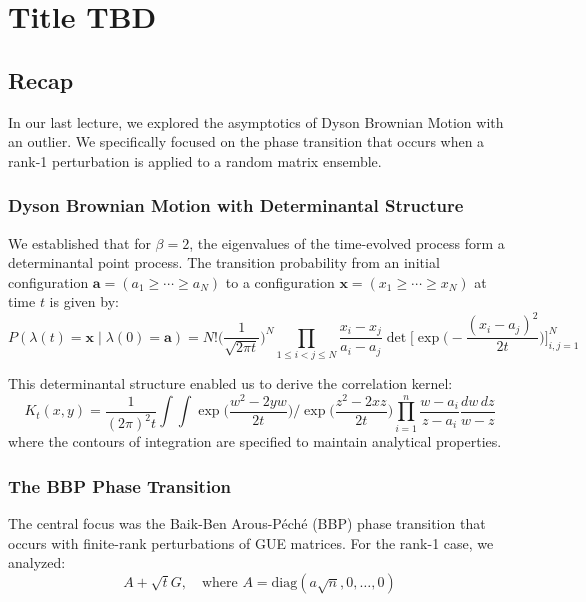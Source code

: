 \documentclass[letterpaper,11pt,oneside,reqno]{book}
\numberwithin{equation}{chapter}  %
\theoremstyle{definition}
\begin{document}
\chapter{Title TBD}
\label{chap:lecture12}





\section{Recap}

In our last lecture, we explored the asymptotics of Dyson Brownian Motion with an outlier. We specifically focused on the phase transition that occurs when a rank-1 perturbation is applied to a random matrix ensemble.

\subsection{Dyson Brownian Motion with Determinantal Structure}

We established that for $\beta=2$, the eigenvalues of the time-evolved process form a determinantal point process. The transition probability from an initial configuration $\mathbf{a} = (a_1 \geq \cdots \geq a_N)$ to a configuration $\mathbf{x} = (x_1 \geq \cdots \geq x_N)$ at time $t$ is given by:
\begin{equation}
P(\lambda(t) = \mathbf{x} \mid \lambda(0) = \mathbf{a}) = N! \Big(\frac{1}{\sqrt{2\pi t}}\Big)^N \prod_{1\leq i<j\leq N}\frac{x_i - x_j}{a_i - a_j} \det\Big[\exp\Big(-\frac{(x_i - a_j)^2}{2t}\Big)\Big]_{i,j=1}^N
\end{equation}

This determinantal structure enabled us to derive the correlation kernel:
\begin{equation}
K_t(x,y) = \frac{1}{(2\pi)^2 t} \int\int \exp\Big(\frac{w^2 - 2yw}{2t}\Big) \bigg/ \exp\Big(\frac{z^2 - 2xz}{2t}\Big) \prod_{i=1}^n \frac{w-a_i}{z-a_i} \frac{dw\,dz}{w-z}
\end{equation}
where the contours of integration are specified to maintain analytical properties.

\subsection{The BBP Phase Transition}

The central focus was the Baik-Ben Arous-Péché (BBP) phase transition that occurs with finite-rank perturbations of GUE matrices. For the rank-1 case, we analyzed:
\begin{equation}
A + \sqrt{t}G, \quad \text{where } A = \text{diag}(a\sqrt{n},0,\ldots,0)
\end{equation}
\end{document}

